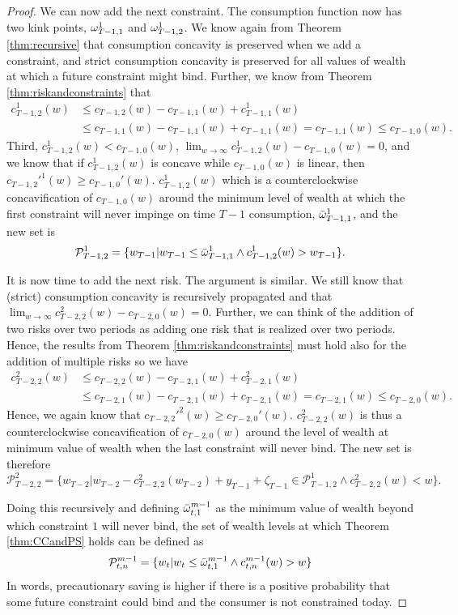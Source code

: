 \begin{proof}
	We can now add the next constraint. The consumption function now has two kink points, $\omega_{T-1,1}^1$ and $\omega_{T-1,2}^1$. We know again from Theorem \ref{thm:recursive} that consumption concavity is preserved when we add a constraint, and strict consumption concavity is preserved for all values of wealth at which a future constraint might bind. Further, we know from Theorem \ref{thm:riskandconstraints} that
		\begin{align*}c_{T-1,2}^1(w) &\leq c_{T-1,2}(w) - c_{T-1,1}(w) + c_{T-1,1}^1(w) \\ &\leq c_{T-1,1}(w) - c_{T-1,1}(w) + c_{T-1,1}(w) = c_{T-1,1}(w) \leq c_{T-1,0}(w). \end{align*}
	Third, $c_{T-1,2}^1(w) < c_{T-1,0}(w)$,  $\lim_{w\rightarrow\infty} c_{T-1,2}^1(w) - c_{T-1,0}(w) = 0$, and we know that if $c_{T-1,2}^1(w)$ is concave while $c_{T-1,0}(w)$ is linear, then $c_{T-1,2}'^{1}(w) \geq c_{T-1,0}'(w)$. $c_{T-1,2}^1(w)$ which is a counterclockwise concavification of $c_{T-1,0}(w)$ around the minimum level of wealth at which the first constraint will never impinge on time $T-1$ consumption, $\bar{\omega}_{T-1,1}^1$, and the new set is
	\[\mathcal{P}_{T-1,2}^1 = \{w_{T-1}| w_{T-1} \leq \bar{\omega}_{T-1,1}^1 \wedge c_{T-1,2}^1(w) > w_{T-1} \}.\]
	
	It is now time to add the next risk. The argument is similar. We still know that (strict) consumption concavity is recursively propagated and that $\lim_{w\rightarrow \infty} c_{T-2,2}^2(w) - c_{T-2,0}(w) = 0$. Further, we can think of the addition of two risks over two periods as adding one risk that is realized over two periods. Hence, the results from Theorem \ref{thm:riskandconstraints} must hold also for the addition of multiple risks so we have
	\begin{align*}c_{T-2,2}^2(w) &\leq c_{T-2,2}(w) - c_{T-2,1}(w) + c_{T-2,1}^2(w) \\ &\leq c_{T-2,1}(w) - c_{T-2,1}(w) + c_{T-2,1}(w) = c_{T-2,1}(w) \leq c_{T-2,0}(w). \end{align*}
	Hence, we again know that $c_{T-2,2}'^{2}(w) \geq c_{T-2,0}'(w)$. $c_{T-2,2}^2(w)$ is thus a counterclockwise concavification of $c_{T-2,0}(w)$ around the level of wealth at minimum value of wealth when the last constraint will never bind. The new set is therefore
	\[\mathcal{P}_{T-2,2}^2 = \{w_{T-2} | w_{T-2} - c_{T-2,2}^2(w_{T-2}) + {y}_{T-1} + \zeta_{T-1} \in \mathcal{P}_{T-1,2}^1 \wedge c_{T-2,2}^{2}(w) < w \}.\]
	
	
	Doing this recursively and defining $\bar{\omega}_{t,1}^{m-1}$ as the minimum value of wealth beyond which constraint $1$ will never bind, the set of wealth levels at which Theorem \ref{thm:CCandPS} holds can be defined as
	\[\mathcal{P}_{t,n}^{m-1} = \{w_t | w_t \leq \bar{\omega}_{t,1}^{m-1} \wedge c_{t,n}^{m-1}(w) > w \}\]
	In words, precautionary saving is higher if there is a positive probability that some future constraint could bind and the consumer is not constrained today.
	

\end{proof}
